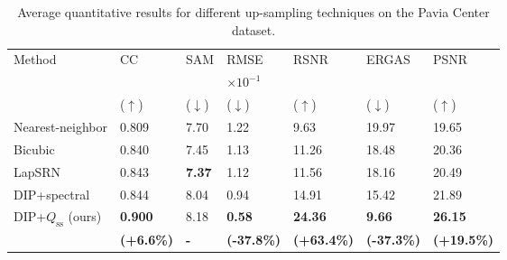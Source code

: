 \documentclass[journal]{IEEEtran}
\begin{document}
    
    \begin{table}[tb]
        \centering
        \caption{Average quantitative results for different up-sampling techniques on the Pavia Center dataset.}
        \begin{tabular}{lp{0.5cm}p{0.5cm}p{0.7cm}p{0.6cm}p{0.7cm}p{0.6cm}}
        \hline
        \multirow{3}{*}{Method} & CC   & SAM & RMSE  & RSNR   & ERGAS       & PSNR \\
        & & & $\times 10^{-1}$ & & & \\
        & ($\uparrow$) & ($\downarrow$) & ($\downarrow$) & ($\uparrow$) & ($\downarrow$) & ($\uparrow$)\\
        \hline
        Nearest-neighbor    & 0.809 & 7.70  & 1.22  & 9.63  & 19.97     & 19.65\\
        Bicubic             & 0.840 & 7.45  & 1.13  & 11.26 & 18.48     & 20.36\\
        LapSRN \cite{LapSRN}& 0.843 & \textbf{7.37} & 1.12 & 11.56 & 18.16 & 20.49\\
        DIP+spectral\cite{DHP-DARN} & 0.844  & 8.04   & 0.94   & 14.91 & 15.42 & 21.89\\
        DIP+$Q_{\text{ss}}$ (ours)& \textbf{0.900}   & 8.18            & \textbf{0.58}     & \textbf{24.36}& \textbf{9.66}       & \textbf{26.15}\\
                            & \textbf{\tiny(+6.6\%)} & \textbf{-} & \textbf{\tiny (-37.8\%)} &    \textbf{\tiny (+63.4\%)} & \textbf{\tiny (-37.3\%)} & \textbf{\tiny (+19.5\%)} \\
        \hline
        \end{tabular}
        \label{tab:pavia_lambda_tune_qt}
    \end{table}
\end{document}
